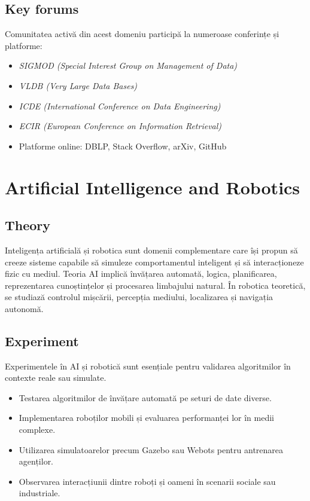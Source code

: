 \documentclass[12pt, letterpaper]{article}
\begin{document}
\subsection*{Key forums}
Comunitatea activă din acest domeniu participă la numeroase conferințe și platforme:
\begin{itemize}
    \item \textit{SIGMOD (Special Interest Group on Management of Data)}
    \item \textit{VLDB (Very Large Data Bases)}
    \item \textit{ICDE (International Conference on Data Engineering)}
    \item \textit{ECIR (European Conference on Information Retrieval)}
    \item Platforme online: DBLP, Stack Overflow, arXiv, GitHub
\end{itemize}


\newpage
\section{Artificial Intelligence and Robotics}

\subsection*{Theory}
Inteligența artificială și robotica sunt domenii complementare care își propun să creeze sisteme capabile să simuleze comportamentul inteligent și să interacționeze fizic cu mediul. Teoria AI implică învățarea automată, logica, planificarea, reprezentarea cunoștințelor și procesarea limbajului natural. În robotica teoretică, se studiază controlul mișcării, percepția mediului, localizarea și navigația autonomă.

\subsection*{Experiment}
Experimentele în AI și robotică sunt esențiale pentru validarea algoritmilor în contexte reale sau simulate.
\begin{itemize}
    \item Testarea algoritmilor de învățare automată pe seturi de date diverse.
    \item Implementarea roboților mobili și evaluarea performanței lor în medii complexe.
    \item Utilizarea simulatoarelor precum Gazebo sau Webots pentru antrenarea agenților.
    \item Observarea interacțiunii dintre roboți și oameni în scenarii sociale sau industriale.
\end{itemize}
\end{document}
